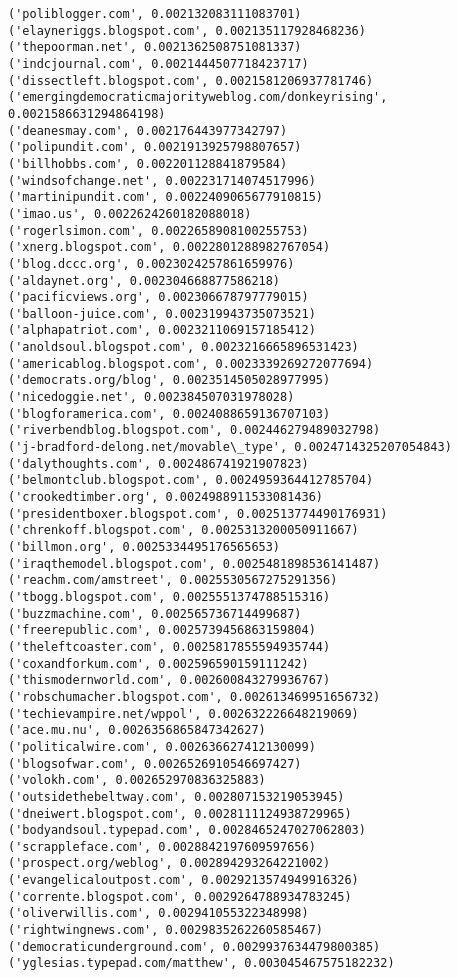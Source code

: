 \documentclass[11pt]{article}
\begin{document}
\begin{Verbatim}[commandchars=\\\{\}]
('poliblogger.com', 0.002132083111083701)
('elayneriggs.blogspot.com', 0.002135117928468236)
('thepoorman.net', 0.0021362508751081337)
('indcjournal.com', 0.0021444507718423717)
('dissectleft.blogspot.com', 0.0021581206937781746)
('emergingdemocraticmajorityweblog.com/donkeyrising', 0.0021586631294864198)
('deanesmay.com', 0.002176443977342797)
('polipundit.com', 0.0021913925798807657)
('billhobbs.com', 0.002201128841879584)
('windsofchange.net', 0.002231714074517996)
('martinipundit.com', 0.0022409065677910815)
('imao.us', 0.0022624260182088018)
('rogerlsimon.com', 0.0022658908100255753)
('xnerg.blogspot.com', 0.0022801288982767054)
('blog.dccc.org', 0.0023024257861659976)
('aldaynet.org', 0.002304668877586218)
('pacificviews.org', 0.002306678797779015)
('balloon-juice.com', 0.002319943735073521)
('alphapatriot.com', 0.0023211069157185412)
('anoldsoul.blogspot.com', 0.0023216665896531423)
('americablog.blogspot.com', 0.0023339269272077694)
('democrats.org/blog', 0.0023514505028977995)
('nicedoggie.net', 0.002384507031978028)
('blogforamerica.com', 0.0024088659136707103)
('riverbendblog.blogspot.com', 0.002446279489032798)
('j-bradford-delong.net/movable\_type', 0.0024714325207054843)
('dalythoughts.com', 0.002486741921907823)
('belmontclub.blogspot.com', 0.0024959364412785704)
('crookedtimber.org', 0.0024988911533081436)
('presidentboxer.blogspot.com', 0.002513774490176931)
('chrenkoff.blogspot.com', 0.0025313200050911667)
('billmon.org', 0.0025334495176565653)
('iraqthemodel.blogspot.com', 0.0025481898536141487)
('reachm.com/amstreet', 0.0025530567275291356)
('tbogg.blogspot.com', 0.0025551374788515316)
('buzzmachine.com', 0.002565736714499687)
('freerepublic.com', 0.0025739456863159804)
('theleftcoaster.com', 0.0025817855594935744)
('coxandforkum.com', 0.002596590159111242)
('thismodernworld.com', 0.002600843279936767)
('robschumacher.blogspot.com', 0.002613469951656732)
('techievampire.net/wppol', 0.002632226648219069)
('ace.mu.nu', 0.0026356865847342627)
('politicalwire.com', 0.002636627412130099)
('blogsofwar.com', 0.0026526910546697427)
('volokh.com', 0.002652970836325883)
('outsidethebeltway.com', 0.002807153219053945)
('dneiwert.blogspot.com', 0.0028111124938729965)
('bodyandsoul.typepad.com', 0.0028465247027062803)
('scrappleface.com', 0.0028842197609597656)
('prospect.org/weblog', 0.002894293264221002)
('evangelicaloutpost.com', 0.0029213574949916326)
('corrente.blogspot.com', 0.0029264788934783245)
('oliverwillis.com', 0.002941055322348998)
('rightwingnews.com', 0.0029835262260585467)
('democraticunderground.com', 0.0029937634479800385)
('yglesias.typepad.com/matthew', 0.003045467575182232)

\end{Verbatim}
\end{document}
